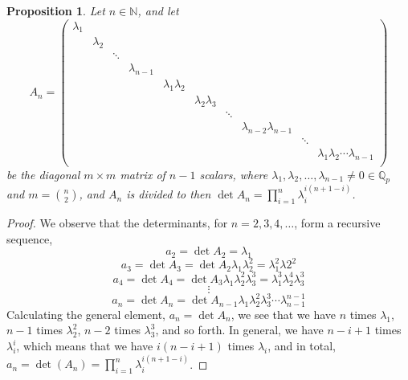 \documentclass[12pt]{article}
\newtheorem{proposition}[theorem]{Proposition}
\begin{document}
\begin{proposition}
\label{prop.h.matrix.determinant}
Let $n\in\mathbb{N}$, and let $$
A_n=\begin{pmatrix}
\lambda_1 & & & & & & & & &\\
& \lambda_2 & & & & & & & &\\
& & \ddots & & & & & & &\\
& & & \lambda_{n-1} & & & & & &\\
& & & & \lambda_1\lambda_2 & & & &\\
& & & & & \lambda_2\lambda_3 & & &\\
& & & & & & \ddots & &\\
& & & & & & & \lambda_{n-2}\lambda_{n-1} &\\
& & & & & & & & \ddots &\\
& & & & & & & & & \lambda_1\lambda_2\cdots\lambda_{n-1}\\
\end{pmatrix}
$$
be the diagonal $m\times m$ matrix of $n-1$ scalars, where $\lambda_1,\lambda_2,\dots,\lambda_{n-1}\neq 0\in\mathbb{Q}_p$ and $m=\binom{n}{2}$, and $A_n$ is divided to  then $\det A_n=\prod_{i=1}^{n}\lambda_i^{i(n+1-i)}$.
\end{proposition}
\begin{proof}
We observe that the determinants, for $n=2,3,4,\dots$, form a recursive sequence,
$$a_2=\det A_2=\lambda_1$$
$$a_3=\det A_3=\det A_2\lambda_1\lambda_2^2=\lambda_1^2\lambda2^2$$
$$a_4=\det A_4=\det A_3\lambda_1\lambda_2^2\lambda_3^3=\lambda_1^3\lambda_2^4\lambda_3^3$$
$$\vdots$$
$$a_n=\det A_n=\det A_{n-1}\lambda_1\lambda_2^2\lambda_3^3\cdots\lambda_{n-1}^{n-1}$$
Calculating the general element, $a_n=\det A_n$, we see that we have $n$ times $\lambda_1$, $n-1$ times $\lambda_2^2$, $n-2$ times $\lambda_3^3$, and so forth. In general, we have $n-i+1$ times $\lambda_i^i$, which means that we have $i(n-i+1)$ times $\lambda_i$, and in total, $a_n=\det(A_n)=\prod_{i=1}^n\lambda_i^{i(n+1-i)}$.
\end{proof}
\end{document}
